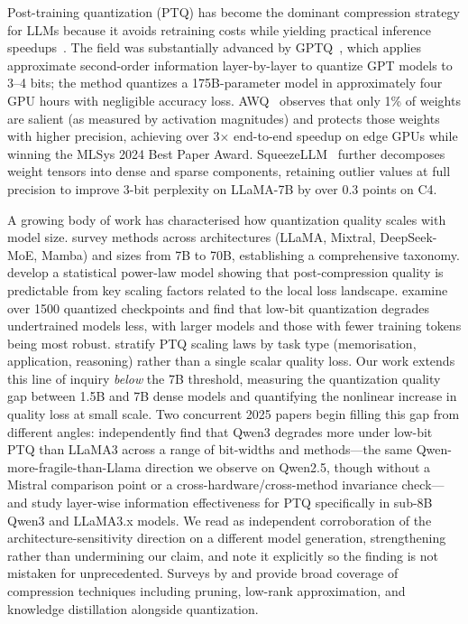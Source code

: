 \documentclass[10pt,twocolumn]{article}
\begin{document}
Post-training quantization (PTQ) has become the dominant compression strategy
for LLMs because it avoids retraining costs while yielding practical inference
speedups~\citep{wan2024efficient}.  The field was substantially advanced by
GPTQ~\citep{frantar2023gptq}, which applies approximate second-order
information layer-by-layer to quantize GPT models to 3--4 bits; the method
quantizes a 175B-parameter model in approximately four GPU hours with
negligible accuracy loss.  AWQ~\citep{lin2023awq} observes that only 1\% of
weights are salient (as measured by activation magnitudes) and protects those
weights with higher precision, achieving over 3$\times$ end-to-end speedup on
edge GPUs while winning the MLSys 2024 Best Paper Award.
SqueezeLLM~\citep{kim2024squeezellm} further decomposes weight tensors into
dense and sparse components, retaining outlier values at full precision to
improve 3-bit perplexity on LLaMA-7B by over 0.3 points on C4.

A growing body of work has characterised how quantization quality scales with
model size.  \citet{zhao2025benchmarking} survey methods across architectures
(LLaMA, Mixtral, DeepSeek-MoE, Mamba) and sizes from 7B to 70B, establishing
a comprehensive taxonomy.  \citet{xu2024scaling} develop a statistical
power-law model showing that post-compression quality is predictable from
key scaling factors related to the local loss landscape.
\citet{ouyang2024lowbit} examine over 1500 quantized checkpoints and find
that low-bit quantization degrades undertrained models less, with larger
models and those with fewer training tokens being most robust.
\citet{zhou2025taskstratified} stratify PTQ scaling laws by task type
(memorisation, application, reasoning) rather than a single scalar quality
loss.  Our work extends this line of inquiry \emph{below} the 7B threshold,
measuring the quantization quality gap between 1.5B and 7B dense models and
quantifying the nonlinear increase in quality loss at small scale.  Two
concurrent 2025 papers begin filling this gap from different angles:
\citet{zheng2025qwen3quant} independently find that Qwen3 degrades more
under low-bit PTQ than LLaMA3 across a range of bit-widths and
methods---the same Qwen-more-fragile-than-Llama direction we observe on
Qwen2.5, though without a Mistral comparison point or a
cross-hardware/cross-method invariance check---and \citet{xiao2025layerwise}
study layer-wise information effectiveness for PTQ specifically in sub-8B
Qwen3 and LLaMA3.x models.  We read \citet{zheng2025qwen3quant} as
independent corroboration of the architecture-sensitivity direction on a
different model generation, strengthening rather than undermining our claim,
and note it explicitly so the finding is not mistaken for unprecedented.
Surveys by
\citet{wan2024efficient} and \citet{zhu2024survey} provide broad coverage of
compression techniques including pruning, low-rank approximation, and
knowledge distillation alongside quantization.
\end{document}
